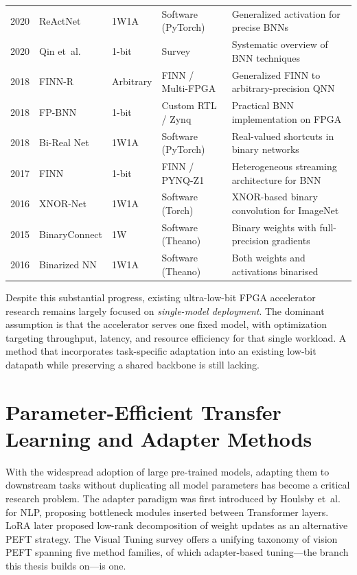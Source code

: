\documentclass[12pt, a4paper]{report}
\numberwithin{equation}{chapter}
\numberwithin{figure}{chapter}
\numberwithin{table}{chapter}
\numberwithin{algorithm}{chapter}
\begin{document}
{\begin{longtable}{@{}c l l l p{4.6cm}@{}}
2020 & ReActNet \cite{Liu2020ReActNet}             & 1W1A        & Software (PyTorch)      & Generalized activation for precise BNNs \\
2020 & Qin et~al. \cite{Qin2020BNNSurvey}         & 1-bit       & Survey                  & Systematic overview of BNN techniques \\
2018 & FINN-R \cite{Blott2018FINNR}               & Arbitrary   & FINN / Multi-FPGA       & Generalized FINN to arbitrary-precision QNN \\
2018 & FP-BNN \cite{Liang2018FPBNN}               & 1-bit       & Custom RTL / Zynq       & Practical BNN implementation on FPGA \\
2018 & Bi-Real Net \cite{Liu2018BiReal}            & 1W1A        & Software (PyTorch)      & Real-valued shortcuts in binary networks \\
2017 & FINN \cite{Umuroglu2017FINN}               & 1-bit       & FINN / PYNQ-Z1          & Heterogeneous streaming architecture for BNN \\
2016 & XNOR-Net \cite{Rastegari2016XNOR}          & 1W1A        & Software (Torch)        & XNOR-based binary convolution for ImageNet \\
2015 & BinaryConnect \cite{Courbariaux2016BinaryConnect} & 1W    & Software (Theano)       & Binary weights with full-precision gradients \\
2016 & Binarized NN \cite{Hubara2016BinarizedNN}   & 1W1A       & Software (Theano)       & Both weights and activations binarised \\
\end{longtable}
}

Despite this substantial progress, existing ultra-low-bit FPGA accelerator research remains largely focused on \emph{single-model deployment}. The dominant assumption is that the accelerator serves one fixed model, with optimization targeting throughput, latency, and resource efficiency for that single workload. A method that incorporates task-specific adaptation into an existing low-bit datapath while preserving a shared backbone is still lacking.

\section{Parameter-Efficient Transfer Learning and Adapter Methods}

With the widespread adoption of large pre-trained models, adapting them to downstream tasks without duplicating all model parameters has become a critical research problem. The adapter paradigm was first introduced by Houlsby et~al.~\cite{Houlsby2019Adapters} for NLP, proposing bottleneck modules inserted between Transformer layers. LoRA \cite{Hu2022LoRA} later proposed low-rank decomposition of weight updates as an alternative PEFT strategy. The Visual Tuning survey \cite{Yu2024VisualTuning} offers a unifying taxonomy of vision PEFT spanning five method families, of which adapter-based tuning---the branch this thesis builds on---is one.
\end{document}
